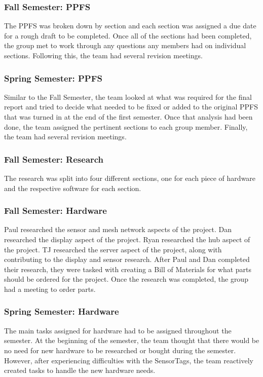 \documentclass[PPFS.tex]{template/subfiles}
\begin{document}
\subsubsection{Fall Semester: PPFS}
The PPFS was broken down by section and each section was assigned a due date for a rough draft to be completed. Once all of the sections had been completed, the group met to work through any questions any members had on individual sections. Following this, the team had several revision meetings.

\subsubsection{Spring Semester: PPFS}
Similar to the Fall Semester, the team looked at what was required for the final report and tried to decide what needed to be fixed or added to the original PPFS that was turned in at the end of the first semester. Once that analysis had been done, the team assigned the pertinent sections to each group member. Finally, the team had several revision meetings.

\subsubsection{Fall Semester: Research}
The research was split into four different sections, one for each piece of hardware and the respective software for each section.

\subsubsection{Fall Semester: Hardware}
Paul researched the sensor and mesh network aspects of the project. Dan researched the display aspect of the project. Ryan researched the hub aspect of the project. TJ researched the server aspect of the project, along with contributing to the display and sensor research. After Paul and Dan completed their research, they were tasked with creating a Bill of Materials for what parts should be ordered for the project. Once the research was completed, the group had a meeting to order parts.

\subsubsection{Spring Semester: Hardware}
The main tasks assigned for hardware had to be assigned throughout the semester. At the beginning of the semester, the team thought that there would be no need for new hardware to be researched or bought during the semester. However, after experiencing difficulties with the SensorTags, the team reactively created tasks to handle the new hardware needs.
\end{document}
